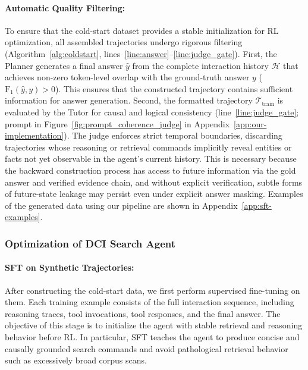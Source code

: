 \documentclass{llmxive}
\begin{document}
\paragraph{Automatic Quality Filtering:}

To ensure that the cold-start dataset provides a stable initialization for RL optimization, all assembled trajectories undergo rigorous filtering (Algorithm~\ref{alg:coldstart}, lines~\ref{line:answer}--\ref{line:judge_gate}). First, the Planner generates a final answer $\hat{y}$ from the complete interaction history $\mathcal{H}$ that achieves non-zero token-level overlap with the ground-truth answer $y$ ($\mathrm{F_1}(\hat{y}, y) > 0$). This ensures that the constructed trajectory contains sufficient information for answer generation. Second, the formatted trajectory $\mathcal{T}_{\mathrm{train}}$ is evaluated by the Tutor for causal and logical consistency (line~\ref{line:judge_gate}; prompt in Figure~\ref{fig:prompt_coherence_judge} in Appendix~\ref{app:our-implementation}). The judge enforces strict temporal boundaries, discarding trajectories whose reasoning or retrieval commands implicitly reveal entities or facts not yet observable in the agent's current history. This is necessary because the backward construction process has access to future information via the gold answer and verified evidence chain, and without explicit verification, subtle forms of future-state leakage may persist even under explicit answer masking. Examples of the generated data using our pipeline are shown in Appendix~\ref{app:sft-examples}.


\subsubsection{Optimization of DCI Search Agent}

\paragraph{SFT on Synthetic Trajectories:}

After constructing the cold-start data, we first perform supervised fine-tuning on them. Each training example consists of the full interaction sequence, including reasoning traces, tool invocations, tool responses, and the final answer. The objective of this stage is to initialize the agent with stable retrieval and reasoning behavior before RL. In particular, SFT teaches the agent to produce concise and causally grounded search commands and avoid pathological retrieval behavior such as excessively broad corpus scans.
\end{document}
